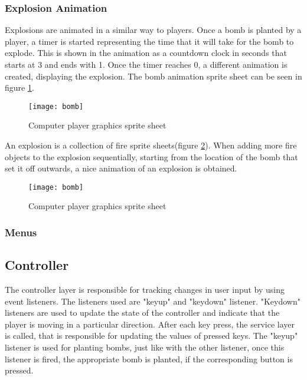 \documentclass[]{article}
\begin{document}
\subsubsection{Explosion Animation}
Explosions are animated in a similar way to players. Once a bomb is planted by a player, a timer is started representing the time that it will take for the bomb to explode. This is shown in the animation as a countdown clock in seconds that starts at 3 and ends with 1. Once the timer reaches 0, a different animation is created, displaying the explosion. The bomb animation sprite sheet can be seen in figure \ref{fig:bomb}.  
\begin{figure}[h]
    \centering
    \texttt{[image: bomb]}
    \caption{Computer player graphics sprite sheet}
    \label{fig:bomb}
\end{figure}

An explosion is a collection of fire sprite sheets(figure \ref{fig:explosion}). When adding more fire objects to the explosion sequentially, starting from the location of the bomb that set it off outwards, a nice animation of an explosion is obtained. 
\begin{figure}[h]
    \centering
    \texttt{[image: bomb]}
    \caption{Computer player graphics sprite sheet}
    \label{fig:explosion}
\end{figure}

\subsubsection{Menus}
\subsection{Controller}
The controller layer is responsible for tracking changes in user input by using event listeners. The listeners used are "keyup" and "keydown" listener. "Keydown" listeners are used to update the state of the controller and indicate that the player is moving in a particular direction. After each key press, the service layer is called, that is responsible for updating the values of pressed keys. The "keyup" listener is used for planting bombs, just like with the other listener, once this listener is fired, the appropriate bomb is planted, if the corresponding button is pressed. 



\end{document}
